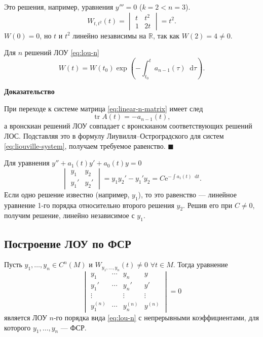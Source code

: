 \documentclass[12pt,a4paper]{article}
\numberwithin{equation}{section}
\newcommand{\R}{\mathbb{R}}
\newcommand{\e}{\mathrm{e}}
\newcommand{\tr}{\operatorname{tr}}
\newcommand{\dd}{\mathop{}\!\mathrm{d}}
\renewenvironment{proof}[1][Доказательство]{\begin{center}\textbf{#1}\end{center}}{\hfill$\blacksquare$\par}
\begin{document}
\begin{exampleHSE}[\(y_1=t,\ y_2=t^2,\ M=\R\)]
Это решения, например, уравнения \(y'''=0\) (\(k=2<n=3\)).
\[
W_{t,t^2}(t)=
\begin{vmatrix}t&t^2\\1&2t\end{vmatrix}=t^2.
\]
\(W(0)=0\), но \(t\) и \(t^2\) линейно независимы на \(\R\), так как \(W(2)=4\neq0\).
\end{exampleHSE}

\begin{theoremHSE}
Для \(n\) решений ЛОУ \eqref{eq:lou-n}
\[
W(t)=W(t_0)\exp\left(-\int_{t_0}^{t}a_{n-1}(\tau)\dd\tau\right).
\]
\end{theoremHSE}

\begin{proof}
При переходе к системе матрица \eqref{eq:linear-n-matrix} имеет след
\[
\tr A(t)=-a_{n-1}(t),
\]
а вронскиан решений ЛОУ совпадает с вронскианом соответствующих решений ЛОС. Подставляя это в формулу Лиувилля--Остроградского для систем \eqref{eq:liouville-system}, получаем требуемое равенство.
\end{proof}

\begin{remarkHSE}[Случай \(n=2\)]
Для уравнения \(y''+a_1(t)y'+a_0(t)y=0\)
\[
\begin{vmatrix}y_1&y_2\\y_1'&y_2'\end{vmatrix}=y_1y_2'-y_1'y_2=C\e^{-\int a_1(t)\dd t}.
\]
Если одно решение известно (например, \(y_1\)), то это равенство --- линейное уравнение 1-го порядка относительно второго решения \(y_2\). Решив его при \(C\neq0\), получим решение, линейно независимое с \(y_1\).
\end{remarkHSE}

\subsection{Построение ЛОУ по ФСР}
\label{subsec:lou-by-fsr}

\begin{theoremHSE}
Пусть \(y_1,\ldots,y_n\in C^n(M)\) и \(W_{y_1,\ldots,y_n}(t)\neq0\) \(\forall t\in M\). Тогда уравнение
\begin{equation}
\begin{vmatrix}
y_1&\cdots&y_n&y\\
y_1'&\cdots&y_n'&y'\\
\vdots&&\vdots&\vdots\\
y_1^{(n)}&\cdots&y_n^{(n)}&y^{(n)}
\end{vmatrix}=0
\label{eq:lou-by-fsr}
\end{equation}
является ЛОУ \(n\)-го порядка вида \eqref{eq:lou-n} с непрерывными коэффициентами, для которого \(y_1,\ldots,y_n\) --- ФСР.
\end{theoremHSE}
\end{document}
